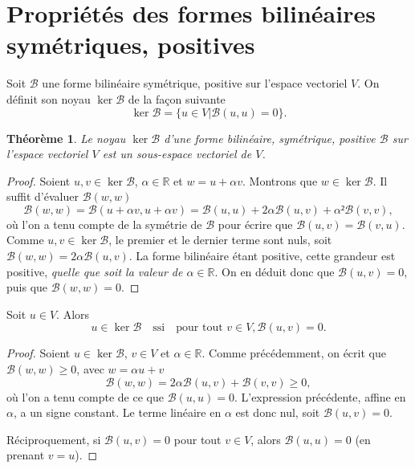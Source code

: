 \documentclass[12pt, final]{amsart}
\newtheorem{theorem}{Théorème}
\newcommand{\reals}{\mathbb{R}}
\begin{document}
\section{Propriétés des formes bilinéaires symétriques, positives}

Soit \(\mathcal B\) une forme bilinéaire symétrique, positive sur l'espace vectoriel
\(V\). On définit son noyau \(\ker\mathcal B\) de la façon suivante
\begin{equation}
  \ker\mathcal B=\{u∈ V|\mathcal B(u, u)=0\}.
\end{equation}

\begin{theorem}
  Le noyau \(\ker\mathcal B\) d'une forme bilinéaire, symétrique, positive
  \(\mathcal B\) sur l'espace vectoriel \(V\) est un sous-espace vectoriel de
  \(V\).
\end{theorem}
\begin{proof}
  Soient \(u, v∈\ker\mathcal B\), \(\alpha∈\reals\) et \(w=u+\alpha
  v\). Montrons que \(w∈\ker\mathcal B\). Il suffit d'évaluer
  \(\mathcal B(w, w)\)
  \begin{equation}
    \mathcal B(w, w)=\mathcal B(u+\alpha v, u+\alpha v)=\mathcal B(u, u)+2\alpha\mathcal B(u, v)+\alpha²\mathcal B(v, v),
  \end{equation}
  où l'on a tenu compte de la symétrie de \(\mathcal B\) pour écrire que
  \(\mathcal B(u, v)=\mathcal B(v, u)\). Comme \(u, v∈\ker\mathcal B\), le
  premier et le dernier terme sont nuls, soit
  \(\mathcal B(w, w)=2\alpha\mathcal B(u, v)\). La forme bilinéaire étant
  positive, cette grandeur est positive, \emph{quelle que soit la valeur de
    \(\alpha∈\reals\)}. On en déduit donc que \(\mathcal B(u, v)=0\), puis
  que \(\mathcal B(w, w)=0\).
\end{proof}

Soit \(u∈ V\). Alors
\begin{equation}
  u∈\ker\mathcal B\quad\text{ssi}\quad\text{pour tout }v∈ V, \mathcal B(u, v)=0.
\end{equation}
\begin{proof}
  Soient \(u∈\ker\mathcal B\), \(v∈ V\) et \(\alpha∈\reals\). Comme
  précédemment, on écrit que \(\mathcal B(w, w)≥0\), avec \(w=\alpha u+v\)
  \begin{equation}
    \mathcal B(w, w)=2\alpha\mathcal B(u, v)+\mathcal B(v, v)≥0,
  \end{equation}
  où l'on a tenu compte de ce que \(\mathcal B(u, u)=0\). L'expression
  précédente, affine en \(\alpha\), a un signe constant. Le terme linéaire en
  \(\alpha\) est donc nul, soit \(\mathcal B(u, v)=0\).

  Réciproquement, si \(\mathcal B(u, v)=0\) pour tout \(v∈ V\), alors
  \(\mathcal B(u, u)=0\) (en prenant \(v=u\)).
\end{proof}
\end{document}
